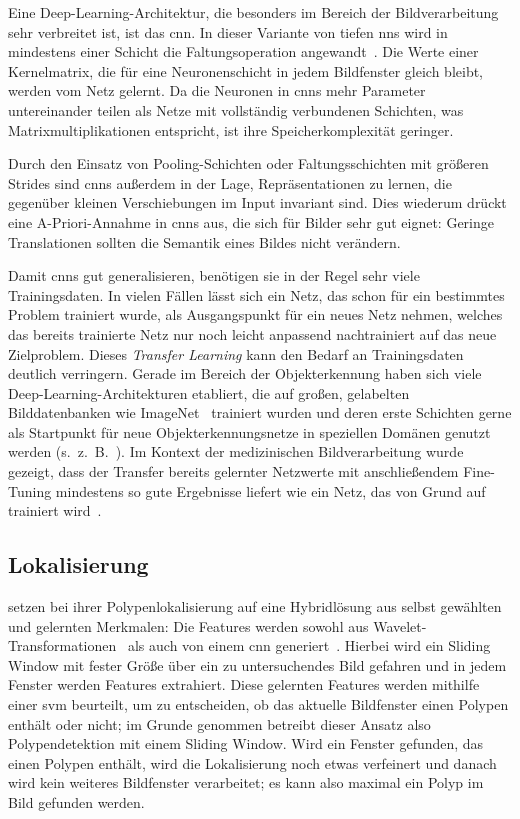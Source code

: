 Eine Deep-Learning-Architektur, die besonders im Bereich der Bildverarbeitung sehr verbreitet ist, ist das \gls{cnn}.
In dieser Variante von tiefen \glspl{nn} wird in mindestens einer Schicht die Faltungsoperation angewandt~\cite{Goodfellow.2016}.
Die Werte einer Kernelmatrix, die für eine Neuronenschicht in jedem Bildfenster gleich bleibt, werden vom Netz gelernt.
Da die Neuronen in \glspl{cnn} mehr Parameter untereinander teilen als Netze mit vollständig verbundenen Schichten, was Matrixmultiplikationen entspricht, ist ihre Speicherkomplexität geringer.

Durch den Einsatz von Pooling-Schichten oder Faltungsschichten mit größeren Strides sind \glspl{cnn} außerdem in der Lage, Repräsentationen zu lernen, die gegenüber kleinen Verschiebungen im Input invariant sind.
Dies wiederum drückt eine A-Priori-Annahme in \glspl{cnn} aus, die sich für Bilder sehr gut eignet:
Geringe Translationen sollten die Semantik eines Bildes nicht verändern.

Damit \glspl{cnn} gut generalisieren, benötigen sie in der Regel sehr viele Trainingsdaten.
In vielen Fällen lässt sich ein Netz, das schon für ein bestimmtes Problem trainiert wurde, als Ausgangspunkt für ein neues Netz nehmen, welches das bereits trainierte Netz nur noch leicht anpassend nachtrainiert auf das neue Zielproblem.
Dieses \emph{Transfer Learning} kann den Bedarf an Trainingsdaten deutlich verringern.
Gerade im Bereich der Objekterkennung haben sich viele Deep-Learning-Architekturen etabliert, die auf großen, gelabelten Bilddatenbanken wie ImageNet~\cite{Deng.2009} trainiert wurden und deren erste Schichten gerne als Startpunkt für neue Objekterkennungsnetze in speziellen Domänen genutzt werden (s.~z.~B.~\cite{Simonyan.2014}).
Im Kontext der medizinischen Bildverarbeitung wurde gezeigt, dass der Transfer bereits gelernter Netzwerte mit anschließendem Fine-Tuning mindestens so gute Ergebnisse liefert wie ein Netz, das von Grund auf trainiert wird~\cite{Tajbakhsh.2016}.



\subsection{Lokalisierung}

\citeauthor{Billah.2017} setzen bei ihrer Polypenlokalisierung auf eine Hybridlösung aus selbst gewählten und gelernten Merkmalen:
Die Features werden sowohl aus Wavelet-Transformationen~\cite{Mallat.1989} als auch von einem \gls{cnn} generiert~\cite{Billah.2017}.
Hierbei wird ein Sliding Window mit fester Größe über ein zu untersuchendes Bild gefahren und in jedem Fenster werden Features extrahiert.
Diese gelernten Features werden mithilfe einer \gls{svm} beurteilt, um zu entscheiden, ob das aktuelle Bildfenster einen Polypen enthält oder nicht; im Grunde genommen betreibt dieser Ansatz also Polypendetektion mit einem Sliding Window.
Wird ein Fenster gefunden, das einen Polypen enthält, wird die Lokalisierung noch etwas verfeinert und danach wird kein weiteres Bildfenster verarbeitet; es kann also maximal ein Polyp im Bild gefunden werden.

